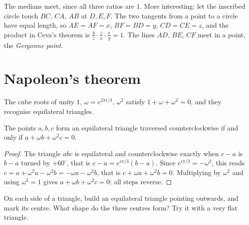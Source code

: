 \begin{example}\label{geometry:exa:gergonne}
The medians meet, since all three ratios are $1$. More interesting: let the inscribed circle touch $BC$, $CA$, $AB$ at $D,E,F$. The two
tangents from a point to a circle have equal length, so $AE=AF=x$, $BF=BD=y$, $CD=CE=z$, and the product in Ceva's theorem is
$\frac yz\cdot\frac zx\cdot\frac xy=1$. The lines $AD$, $BE$, $CF$ meet in a point, the \emph{Gergonne point}.
\end{example}

\section{Napoleon's theorem}

The cube roots of unity $1$, $\omega=e^{2\pi i/3}$, $\omega^2$ satisfy $1+\omega+\omega^2=0$, and they recognise equilateral
triangles.

\begin{lemma}\label{geometry:lem:equilateral}
The points $a,b,c$ form an equilateral triangle traversed counterclockwise if and only if $a+\omega b+\omega^2c=0$.
\end{lemma}
\begin{proof}
The triangle $abc$ is equilateral and counterclockwise exactly when $c-a$ is $b-a$ turned by $+60^\circ$, that is
$c-a=e^{i\pi/3}(b-a)$. Since $e^{i\pi/3}=-\omega^2$, this reads $c=a+\omega^2a-\omega^2b=-\omega a-\omega^2b$, that is
$c+\omega a+\omega^2b=0$. Multiplying by $\omega^2$ and using $\omega^3=1$ gives $a+\omega b+\omega^2c=0$; all steps reverse.
\end{proof}

\begin{think}
On each side of a triangle, build an equilateral triangle pointing outwards, and mark its centre. What shape do the three centres form?
Try it with a very flat triangle.
\end{think}

